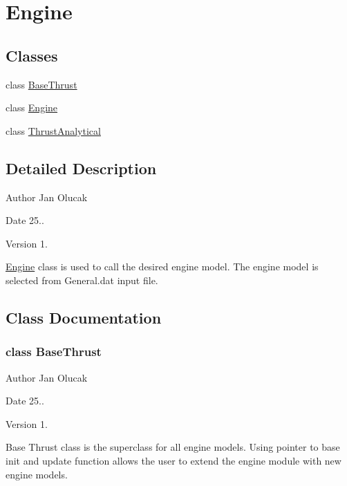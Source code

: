\hypertarget{group___engine}{}\section{Engine}
\label{group___engine}
\subsection*{Classes}
\begin{DoxyCompactItemize}
\item 
class \hyperlink{group___engine_class_base_thrust}{Base\+Thrust}
\item 
class \hyperlink{group___engine_class_engine}{Engine}
\item 
class \hyperlink{group___engine_class_thrust_analytical}{Thrust\+Analytical}
\end{DoxyCompactItemize}


\subsection{Detailed Description}
\begin{DoxyAuthor}{Author}
Jan Olucak 
\end{DoxyAuthor}
\begin{DoxyDate}{Date}
25.. 
\end{DoxyDate}
\begin{DoxyVersion}{Version}
1.
\end{DoxyVersion}
\hyperlink{group___engine_class_engine}{Engine} class is used to call the desired engine model. The engine model is selected from General.\+dat input file. 

\subsection{Class Documentation}
\label{class_base_thrust}
\subsubsection{class Base\+Thrust}
\begin{DoxyAuthor}{Author}
Jan Olucak 
\end{DoxyAuthor}
\begin{DoxyDate}{Date}
25.. 
\end{DoxyDate}
\begin{DoxyVersion}{Version}
1.
\end{DoxyVersion}
Base Thrust class is the superclass for all engine models. Using pointer to base init and update function allows the user to extend the engine module with new engine models. 

